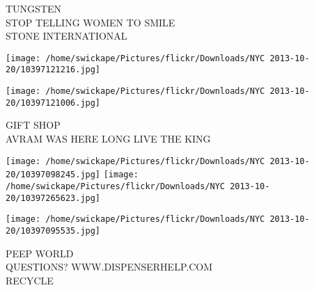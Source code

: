 \documentclass[10pt,letterpaper]{article}
\begin{document}
TUNGSTEN\\
STOP TELLING WOMEN TO SMILE\\
STONE INTERNATIONAL
\pagebreak

\texttt{[image: /home/swickape/Pictures/flickr/Downloads/NYC 2013-10-20/10397121216.jpg]}

\vspace{0.25in}
\texttt{[image: /home/swickape/Pictures/flickr/Downloads/NYC 2013-10-20/10397121006.jpg]}

GIFT SHOP\\
AVRAM WAS HERE LONG LIVE THE KING
\pagebreak

\texttt{[image: /home/swickape/Pictures/flickr/Downloads/NYC 2013-10-20/10397098245.jpg]}
\texttt{[image: /home/swickape/Pictures/flickr/Downloads/NYC 2013-10-20/10397265623.jpg]}

\texttt{[image: /home/swickape/Pictures/flickr/Downloads/NYC 2013-10-20/10397095535.jpg]}

PEEP WORLD\\
QUESTIONS?  WWW.DISPENSERHELP.COM\\
RECYCLE
\pagebreak
\end{document}
